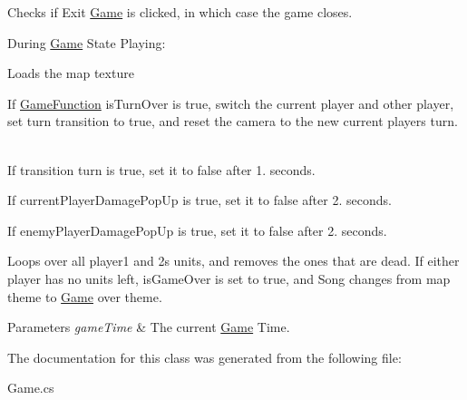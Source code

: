 \begin{DoxyItemize}
\begin{DoxyEnumerate}
\item Checks if Exit \hyperlink{class_controller_1_1_game}{Game} is clicked, in which case the game closes. ~\newline

\end{DoxyEnumerate}
\item During \hyperlink{class_controller_1_1_game}{Game} State Playing\+: ~\newline

\begin{DoxyEnumerate}
\item Loads the map texture ~\newline

\item If \hyperlink{class_controller_1_1_game_function}{Game\+Function} is\+Turn\+Over is true, switch the current player and other player, set turn transition to true, and reset the camera to the new current player\textquotesingle{}s turn. ~\newline

\item If transition turn is true, set it to false after 1. seconds. ~\newline

\item If current\+Player\+Damage\+Pop\+Up is true, set it to false after 2. seconds. ~\newline

\item If enemy\+Player\+Damage\+Pop\+Up is true, set it to false after 2. seconds. ~\newline

\item Loops over all player1 and 2\textquotesingle{}s units, and removes the ones that are dead. If either player has no units left, is\+Game\+Over is set to true, and Song changes from map theme to \hyperlink{class_controller_1_1_game}{Game} over theme. ~\newline
 
\begin{DoxyParams}{Parameters}
{\em game\+Time} & The current \hyperlink{class_controller_1_1_game}{Game} Time. \\
\hline
\end{DoxyParams}

\end{DoxyEnumerate}
\end{DoxyItemize}

The documentation for this class was generated from the following file\+:\begin{DoxyCompactItemize}
\item 
Game.\+cs\end{DoxyCompactItemize}
